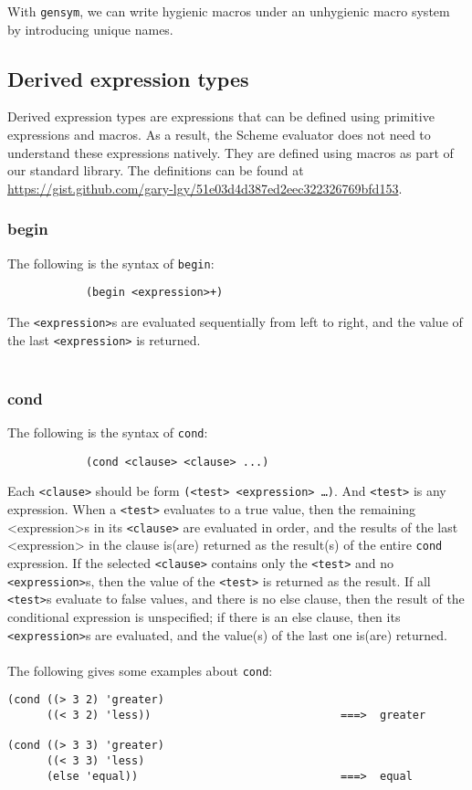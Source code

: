 \documentclass{article}
\begin{document}
With \texttt{gensym}, we can write hygienic macros under an unhygienic macro system by introducing unique names.

\subsection*{Derived expression types}


Derived expression types are expressions that can be defined using primitive expressions and macros. As a result, the Scheme evaluator does not need to understand these expressions natively. They are defined using macros as part of our standard library. The definitions can be found at\\
\url{https://gist.github.com/gary-lgy/51e03d4d387ed2eec322326769bfd153}.

\subsubsection*{begin}
The following is the syntax of \texttt{begin}:
\begin{lstlisting}
            (begin <expression>+)
\end{lstlisting}
The \texttt{<expression>}s are evaluated sequentially from left to right, and the value of the last \texttt{<expression>} is returned.\\ \\

\subsubsection*{cond}
The following is the syntax of \texttt{cond}:
\begin{lstlisting}
            (cond <clause> <clause> ...)
\end{lstlisting}
Each \texttt{<clause>} should be form \texttt{(<test> <expression> \dots)}. And \texttt{<test>} is any expression. When a \texttt{<test>} evaluates to a true value, then the remaining <expression>s in its \texttt{<clause>} are evaluated in order, and the results of the last <expression> in the clause is(are) returned as the result(s) of the entire \texttt{cond} expression. If the selected \texttt{<clause>} contains only the \texttt{<test>} and no \texttt{<expression>}s, then the value of the \texttt{<test>} is returned as the result. If all \texttt{<test>}s evaluate to false values, and there is no else clause, then the result of the conditional expression is unspecified; if there is an else clause, then its \texttt{<expression>}s are evaluated, and the value(s) of the last one is(are) returned.\\ \\The following gives some examples about \texttt{cond}:
\begin{lstlisting}
(cond ((> 3 2) 'greater)
      ((< 3 2) 'less))                             ===>  greater

(cond ((> 3 3) 'greater)
      ((< 3 3) 'less)
      (else 'equal))                               ===>  equal
\end{lstlisting}
\end{document}
